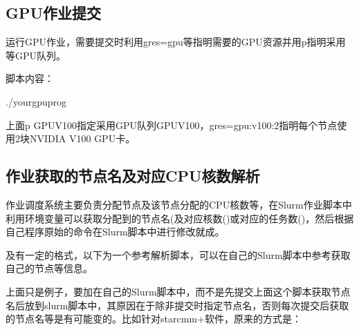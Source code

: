 \documentclass[a4paper,12pt,english]{sphinxmanual}
\begin{document}
\sphinxAtStartPar
{}


\subsection{GPU作业提交}
\label{\detokenize{slurm/slurm:gpu}}
\sphinxAtStartPar
运行GPU作业，需要提交时利用\sphinxhyphen{}\sphinxhyphen{}gres=gpu等指明需要的GPU资源并用\sphinxhyphen{}p指明采用等GPU队列。

\sphinxAtStartPar
脚本内容：

\begin{sphinxVerbatim}[commandchars=\\\{\}]
./your\PYGZhy{}gpu\PYGZhy{}prog
\end{sphinxVerbatim}

\sphinxAtStartPar
上面\sphinxhyphen{}p GPU\sphinxhyphen{}V100指定采用GPU队列GPU\sphinxhyphen{}V100，\sphinxhyphen{}\sphinxhyphen{}gres=gpu:v100:2指明每个节点使用2块NVIDIA V100 GPU卡。


\subsection{作业获取的节点名及对应CPU核数解析}
\label{\detokenize{slurm/slurm:cpu}}
\sphinxAtStartPar
作业调度系统主要负责分配节点及该节点分配的CPU核数等，在Slurm作业脚本中利用环境变量可以获取分配到的节点名(及对应核数()或对应的任务数()，然后根据自己程序原始的命令在Slurm脚本中进行修改就成。

\sphinxAtStartPar
{}及有一定的格式，以下为一个参考解析脚本，可以在自己的Slurm脚本中参考获取自己的节点等信息。

\sphinxAtStartPar
上面只是例子，要加在自己的Slurm脚本中，而不是先提交上面这个脚本获取节点名后放到slurm脚本中，其原因在于除非提交时指定节点名，否则每次提交后获取的节点名等是有可能变的。比如针对star\sphinxhyphen{}cmm+软件，原来的方式是：
\begin{quote}

\sphinxAtStartPar
{}
\end{quote}
\end{document}
